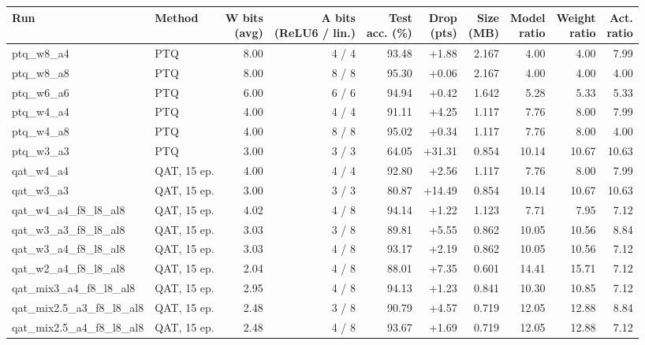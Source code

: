 \begin{tabular}{llrrrrrrrr}
\toprule
Run & Method & \shortstack{W bits\\(avg)} & \shortstack{A bits\\(ReLU6 / lin.)} & \shortstack{Test\\acc. (\%)} & \shortstack{Drop\\(pts)} & \shortstack{Size\\(MB)} & \shortstack{Model\\ratio} & \shortstack{Weight\\ratio} & \shortstack{Act.\\ratio} \\
\midrule
ptq\_w8\_a4 & PTQ & 8.00 & 4 / 4 & 93.48 & +1.88 & 2.167 & 4.00 & 4.00 & 7.99 \\
ptq\_w8\_a8 & PTQ & 8.00 & 8 / 8 & 95.30 & +0.06 & 2.167 & 4.00 & 4.00 & 4.00 \\
ptq\_w6\_a6 & PTQ & 6.00 & 6 / 6 & 94.94 & +0.42 & 1.642 & 5.28 & 5.33 & 5.33 \\
ptq\_w4\_a4 & PTQ & 4.00 & 4 / 4 & 91.11 & +4.25 & 1.117 & 7.76 & 8.00 & 7.99 \\
ptq\_w4\_a8 & PTQ & 4.00 & 8 / 8 & 95.02 & +0.34 & 1.117 & 7.76 & 8.00 & 4.00 \\
ptq\_w3\_a3 & PTQ & 3.00 & 3 / 3 & 64.05 & +31.31 & 0.854 & 10.14 & 10.67 & 10.63 \\
\midrule
qat\_w4\_a4 & QAT, 15 ep. & 4.00 & 4 / 4 & 92.80 & +2.56 & 1.117 & 7.76 & 8.00 & 7.99 \\
qat\_w3\_a3 & QAT, 15 ep. & 3.00 & 3 / 3 & 80.87 & +14.49 & 0.854 & 10.14 & 10.67 & 10.63 \\
\midrule
qat\_w4\_a4\_f8\_l8\_al8 & QAT, 15 ep. & 4.02 & 4 / 8 & 94.14 & +1.22 & 1.123 & 7.71 & 7.95 & 7.12 \\
qat\_w3\_a3\_f8\_l8\_al8 & QAT, 15 ep. & 3.03 & 3 / 8 & 89.81 & +5.55 & 0.862 & 10.05 & 10.56 & 8.84 \\
qat\_w3\_a4\_f8\_l8\_al8 & QAT, 15 ep. & 3.03 & 4 / 8 & 93.17 & +2.19 & 0.862 & 10.05 & 10.56 & 7.12 \\
qat\_w2\_a4\_f8\_l8\_al8 & QAT, 15 ep. & 2.04 & 4 / 8 & 88.01 & +7.35 & 0.601 & 14.41 & 15.71 & 7.12 \\
\midrule
qat\_mix3\_a4\_f8\_l8\_al8 & QAT, 15 ep. & 2.95 & 4 / 8 & 94.13 & +1.23 & 0.841 & 10.30 & 10.85 & 7.12 \\
qat\_mix2.5\_a3\_f8\_l8\_al8 & QAT, 15 ep. & 2.48 & 3 / 8 & 90.79 & +4.57 & 0.719 & 12.05 & 12.88 & 8.84 \\
qat\_mix2.5\_a4\_f8\_l8\_al8 & QAT, 15 ep. & 2.48 & 4 / 8 & 93.67 & +1.69 & 0.719 & 12.05 & 12.88 & 7.12 \\

\end{tabular}
